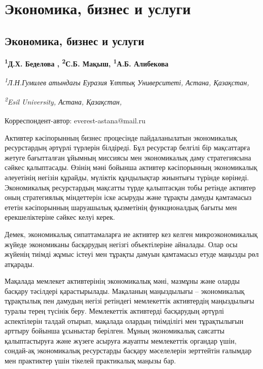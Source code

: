 \newpage
\let\cleardoublepage\clearpage
\part{Экономика, бизнес и услуги}
\let\cleardoublepage\clearpage
\chapter{Экономика, бизнес и услуги}

\begin{articleheader}

{\bfseries
\textsuperscript{1}Д.Х. Беделова\textsuperscript{\envelope } \authorid,
\textsuperscript{2}С.Б. Мақыш\authorid,
\textsuperscript{1}А.Б. Алибекова\authorid}
\end{articleheader}

\begin{affiliation}
{\em \textsuperscript{1}Л.Н.Гумилев атындағы Еуразия Ұлттық Университеті, Астана, Қазақстан,}

{\em \textsuperscript{2}Esil University, Астана, Қазақстан,}

\textsuperscript{\envelope }Корреспондент-автор: everest-astana@mail.ru
\end{affiliation}

Активтер кәсіпорынның бизнес процесінде пайдаланылатын экономикалық
ресурстардың әртүрлі түрлерін білдіреді. Бұл ресурстар белгілі бір
мақсаттарға жетуге бағытталған ұйымның миссиясы мен экономикалық даму
стратегиясына сәйкес қалыптасады. Өзінің мәні бойынша активтер
кәсіпорынның экономикалық әлеуетінің негізін құрайды, мүліктік
құндылықтар жиынтығы түрінде көрінеді. Экономикалық ресурстардың
мақсатты түрде қалыптасқан тобы ретінде активтер оның стратегиялық
міндеттерін іске асыруды және тұрақты дамуды қамтамасыз ететін
кәсіпорынның шаруашылық қызметінің функционалдық бағыты мен
ерекшеліктеріне сәйкес келуі керек.

Демек, экономикалық сипаттамаларға ие активтер кез келген
микроэкономикалық жүйеде экономиканы басқарудың негізгі объектілеріне
айналады. Олар осы жүйенің тиімді жұмыс істеуі мен тұрақты дамуын
қамтамасыз етуде маңызды рөл атқарады.

Мақалада мемлекет активтерінің экономикалық мәні, мазмұны және оларды
басқару тәсілдері қарастырылады. Мақаланың маңыздылығы -- экономикалық
тұрақтылық пен дамудың негізі ретіндегі мемлекеттік активтердің
маңыздылығы туралы терең түсінік беру. Мемлекеттік активтерді басқарудың
әртүрлі аспектілерін талдай отырып, мақалада олардың тиімділігі мен
тұрақтылығын арттыру бойынша ұсыныстар берілген. Мұның экономикалық
саясатты қалыптастыруға және жүзеге асыруға жауапты мемлекеттік органдар
үшін, сондай-ақ экономикалық ресурстарды басқару мәселелерін зерттейтін
ғалымдар мен практиктер үшін тікелей практикалық маңызы бар.

